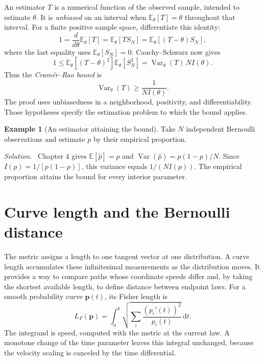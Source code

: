 \documentclass[11pt,oneside,openany]{book}
\theoremstyle{definition}
\newtheorem{example}{Example}[chapter]
\theoremstyle{remark}
\newenvironment{solution}{\par\smallskip\noindent\textit{Solution.}\ }{\par\smallskip}
\newcommand{\E}{\mathbb{E}}
\newcommand{\Var}{\operatorname{Var}}
\newcommand{\dd}{\,\mathrm{d}}
\newcommand{\p}{\mathbf{p}}
\numberwithin{equation}{chapter}
\begin{document}
An estimator $T$ is a numerical function of the observed sample, intended to estimate $\theta$. It is \emph{unbiased} on an interval when $\E_\theta[T]=\theta$ throughout that interval. For a finite positive sample space, differentiate this identity:
\[
1=\frac{d}{d\theta}\E_\theta[T]=\E_\theta[T S_N]
=\E_\theta[(T-\theta)S_N],
\]
where the last equality uses $\E_\theta[S_N]=0$. Cauchy--Schwarz now gives
\[
1\leq\E_\theta[(T-\theta)^2]\E_\theta[S_N^2]
=\Var_\theta(T)\,N I(\theta).
\]
Thus the \emph{Cram\'er--Rao bound} is
\begin{equation}\label{eq:crbound}
\Var_\theta(T)\geq\frac1{NI(\theta)}.
\end{equation}
The proof uses unbiasedness in a neighborhood, positivity, and differentiability. Those hypotheses specify the estimation problem to which the bound applies.

\begin{example}[An estimator attaining the bound]
Take $N$ independent Bernoulli observations and estimate $p$ by their empirical proportion.
\begin{solution}
Chapter 4 gives $\E[\widehat p]=p$ and $\Var(\widehat p)=p(1-p)/N$. Since $I(p)=1/[p(1-p)]$, this variance equals $1/(NI(p))$. The empirical proportion attains the bound for every interior parameter.
\end{solution}
\end{example}

\section{Curve length and the Bernoulli distance}
The metric assigns a length to one tangent vector at one distribution. A curve length accumulates these infinitesimal measurements as the distribution moves. It provides a way to compare paths whose coordinate speeds differ and, by taking the shortest available length, to define distance between endpoint laws.
For a smooth probability curve $\p(t)$, its Fisher length is
\begin{equation}\label{eq:fisherlength}
L_F(\p)=\int_a^b\sqrt{\sum_i\frac{(p_i'(t))^2}{p_i(t)}}\dd t.
\end{equation}
The integrand is speed, computed with the metric at the current law. A monotone change of the time parameter leaves this integral unchanged, because the velocity scaling is canceled by the time differential.
\end{document}
